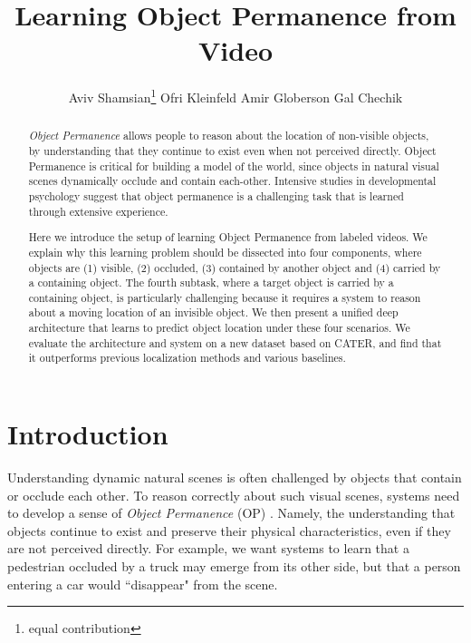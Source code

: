 \documentclass[]{llncs}
\makeatletter
\newcommand{\printfnsymbol}[1]{\textsuperscript{\@fnsymbol{#1}}}
\makeatother
\begin{document}
\pagestyle{headings}
\mainmatter
\def\ECCVSubNumber{2481}  

\author{Aviv Shamsian\thanks{equal contribution} \quad 
Ofri Kleinfeld\printfnsymbol{1}  \quad 
Amir Globerson \quad
Gal Chechik}

\title{Learning Object Permanence from Video} 













\maketitle
\begin{abstract}
\emph{Object Permanence} allows people to reason about the location of non-visible objects, by understanding that they continue to exist even when not perceived directly. Object Permanence is critical for building a model of the world, since objects in natural visual scenes dynamically occlude and contain each-other. Intensive studies in developmental psychology suggest that object permanence is a challenging task that is learned through extensive experience.

Here we introduce the setup of learning Object Permanence from labeled videos. We explain why this learning problem should be dissected into four components, where objects are (1) visible, (2) occluded, (3) contained by another object and (4) carried by a containing object.  
The fourth subtask, where a target object is carried by a containing object, is particularly challenging because it requires a system to reason about a moving location of an invisible object. We then present a unified deep architecture that learns to predict object location under these four scenarios. We evaluate the architecture and system on a new dataset based on CATER, and find that it outperforms previous localization methods and various baselines.  

\end{abstract}

\section{Introduction}
Understanding dynamic natural scenes is often challenged by objects that contain or occlude each other. To reason correctly about such visual scenes, systems need to develop a sense of \textit{Object Permanence} (OP) \cite{Piaget1954TheCO}. Namely, the understanding that objects continue to exist and preserve their physical characteristics, even if they are not perceived directly. For example, we want systems to learn that a pedestrian occluded by a truck may emerge from its other side, but that a person entering a car would ``disappear" from the scene. 
\end{document}
